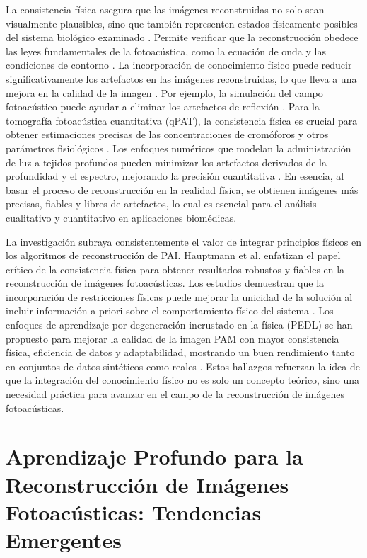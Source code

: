 La consistencia física asegura que las imágenes reconstruidas no solo sean visualmente plausibles, sino que también representen estados físicamente posibles del sistema biológico examinado \cite{hauptmann_2024}. Permite verificar que la reconstrucción obedece las leyes fundamentales de la fotoacústica, como la ecuación de onda y las condiciones de contorno \cite{hauptmann_2024}. La incorporación de conocimiento físico puede reducir significativamente los artefactos en las imágenes reconstruidas, lo que lleva a una mejora en la calidad de la imagen \cite{hauptmann_2024}. Por ejemplo, la simulación del campo fotoacústico puede ayudar a eliminar los artefactos de reflexión \cite{deep_learning_artifacts_2024}. Para la tomografía fotoacústica cuantitativa (qPAT), la consistencia física es crucial para obtener estimaciones precisas de las concentraciones de cromóforos y otros parámetros fisiológicos \cite{quantitative_pat_2021}. Los enfoques numéricos que modelan la administración de luz a tejidos profundos pueden minimizar los artefactos derivados de la profundidad y el espectro, mejorando la precisión cuantitativa \cite{quantitative_pa_deep_2016}. En esencia, al basar el proceso de reconstrucción en la realidad física, se obtienen imágenes más precisas, fiables y libres de artefactos, lo cual es esencial para el análisis cualitativo y cuantitativo en aplicaciones biomédicas.

La investigación subraya consistentemente el valor de integrar principios físicos en los algoritmos de reconstrucción de PAI. Hauptmann et al. \cite{hauptmann_2024} enfatizan el papel crítico de la consistencia física para obtener resultados robustos y fiables en la reconstrucción de imágenes fotoacústicas. Los estudios demuestran que la incorporación de restricciones físicas puede mejorar la unicidad de la solución al incluir información a priori sobre el comportamiento físico del sistema \cite{hauptmann_2024}. Los enfoques de aprendizaje por degeneración incrustado en la física (PEDL) se han propuesto para mejorar la calidad de la imagen PAM con mayor consistencia física, eficiencia de datos y adaptabilidad, mostrando un buen rendimiento tanto en conjuntos de datos sintéticos como reales \cite{enhanced_pam_2024}. Estos hallazgos refuerzan la idea de que la integración del conocimiento físico no es solo un concepto teórico, sino una necesidad práctica para avanzar en el campo de la reconstrucción de imágenes fotoacústicas.

\section{Aprendizaje Profundo para la Reconstrucción de Imágenes Fotoacústicas: Tendencias Emergentes}

